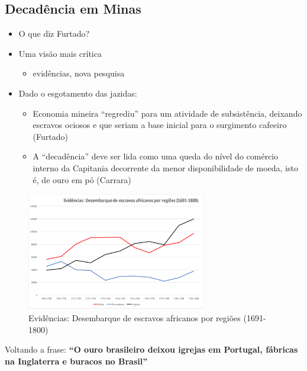 \documentclass[a4paper,12pt]{article}[abntex2]
\begin{document}
\subsection{\textbf{Decadência em Minas}}
\begin{itemize}
    \item O que diz Furtado?
    \item Uma visão mais crítica \begin{itemize}
        \item evidências, nova pesquisa
    \end{itemize}
    \item Dado o esgotamento das jazidas: \begin{itemize}
        \item Economia mineira “regrediu” para um atividade de subsistência, deixando escravos ociosos e que seriam a base inicial para o surgimento cafeeiro (Furtado)
        \item A “decadência” deve ser lida como uma queda do nível do comércio interno da Capitania decorrente da menor disponibilidade de moeda, isto é, de ouro em pó (Carrara)
    \end{itemize}
\end{itemize}

\begin{figure}[H]
    \centering
    \includegraphics[width=0.7\textwidth]{Imagens Slides/i2a3.png}
    \caption{Evidências: Desembarque de escravos africanos por regiões (1691-1800)}
\end{figure}

Voltando a frase:\textbf{ “O ouro brasileiro deixou igrejas em Portugal, fábricas na Inglaterra e buracos no Brasil”}
\end{document}
